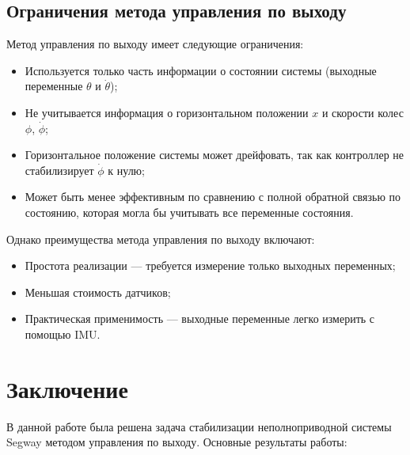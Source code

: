 \subsection{Ограничения метода управления по выходу}

Метод управления по выходу имеет следующие ограничения:
\begin{itemize}
    \item Используется только часть информации о состоянии системы (выходные переменные $\theta$ и $\dot{\theta}$);
    \item Не учитывается информация о горизонтальном положении $x$ и скорости колес $\phi$, $\dot{\phi}$;
    \item Горизонтальное положение системы может дрейфовать, так как контроллер не стабилизирует $\dot{\phi}$ к нулю;
    \item Может быть менее эффективным по сравнению с полной обратной связью по состоянию, которая могла бы учитывать все переменные состояния.
\end{itemize}

Однако преимущества метода управления по выходу включают:
\begin{itemize}
    \item Простота реализации --- требуется измерение только выходных переменных;
    \item Меньшая стоимость датчиков;
    \item Практическая применимость --- выходные переменные легко измерить с помощью IMU.
\end{itemize}

\section{Заключение}

В данной работе была решена задача стабилизации неполноприводной системы Segway методом управления по выходу. Основные результаты работы:

